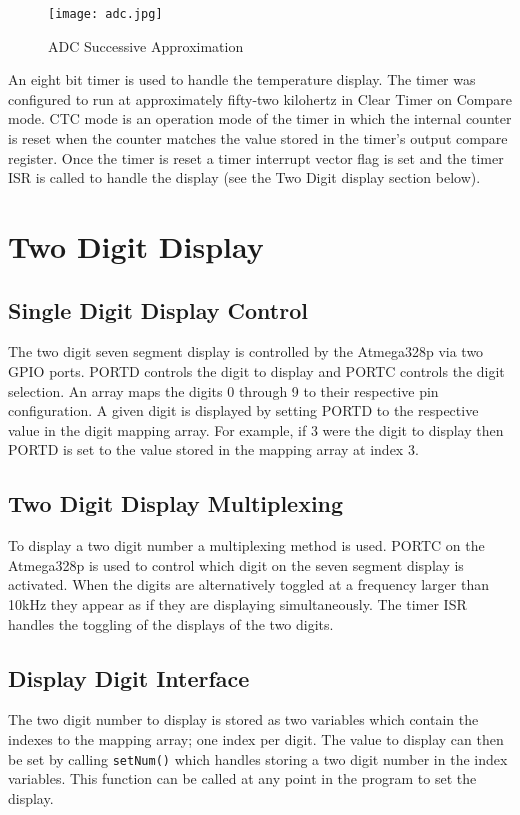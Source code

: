 \documentclass[main.tex]{subfiles}
\begin{document}
		\begin{figure}[H]
			\begin{center}
				\texttt{[image: adc.jpg]}
			\end{center}
			\caption{ADC Successive Approximation}
			\label{fig:adcSA}
		\end{figure}
	
	An eight bit timer is used to handle the temperature display. The timer was
	configured to run at approximately fifty-two kilohertz in Clear Timer on
	Compare mode. CTC mode is an operation mode of the timer in which the internal
	counter is reset when the counter matches the value stored in the timer's
	output compare register. Once the timer is reset a timer interrupt vector flag
	is set and the timer ISR is called to handle the display (see the Two Digit
	display section below).

	\section{Two Digit Display}
		\subsection{Single Digit Display Control}
		The two digit seven segment display is controlled by the Atmega328p via two GPIO
		ports. PORTD controls the digit to display and PORTC controls the digit
		selection. An array maps the digits 0 through 9 to their respective pin
		configuration. A given digit is displayed by setting PORTD to the respective
		value in the digit mapping array. For example, if 3 were the digit to display
		then PORTD is set to the value stored in the mapping array at index 3. 

		\subsection{Two Digit Display Multiplexing}
		To display a two digit number a multiplexing method is used. PORTC on the
		Atmega328p is used to control which digit on the seven segment display is
		activated. When the digits are alternatively toggled at a frequency larger
		than 10kHz they appear as if they are displaying simultaneously. The timer  
		ISR handles the toggling of the displays of the two digits.

		\subsection{Display Digit Interface}
		The two digit number to display is stored as two variables which
		contain the indexes to the mapping array; one index per digit. The value to
		display can then be set by calling \lstinline{setNum()} which handles
		storing a two digit number in the index variables. This function can be
		called at any point in the program to set the display.
\end{document}
